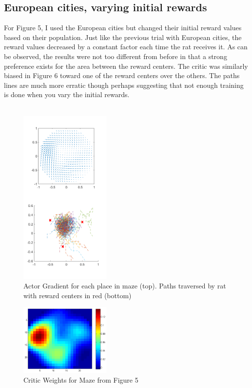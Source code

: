 \documentclass[conference]{IEEEtran}
\begin{document}
\subsection{European cities, varying initial rewards}

For Figure 5, I used the European cities but changed their initial reward values based on their population. Just like the previous trial with European cities, the reward values decreased by a constant factor each time the rat receives it. As can be observed, the results were not too different from before in that a strong preference exists for the area between the reward centers. The critic was similarly biased in Figure 6 toward one of the reward centers over the others. The paths lines are much more erratic though perhaps suggesting that not enough training is done when you vary the initial rewards. \\
\\
\begin{figure}
\includegraphics[width=0.4\textwidth]{waterMazeRevised2_Figure_populationRewards.png} 
\caption{Actor Gradient for each place in maze (top). Paths traversed by rat with reward centers in red (bottom)}
\end{figure}

\begin{figure}
\includegraphics[width=0.4\textwidth]{waterMazeRevised2_Critic_populationRewards.png} 
\caption{Critic Weights for Maze from Figure 5}
\end{figure}
\end{document}
